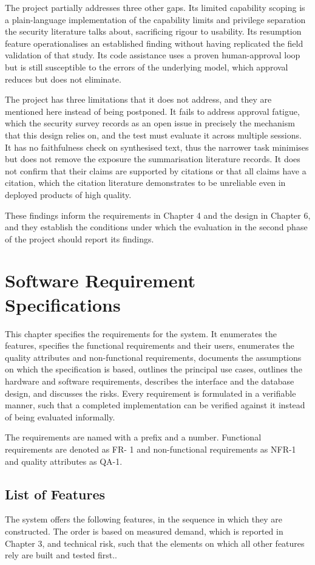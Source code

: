 \documentclass{FastFyp}
\begin{document}
The project partially addresses three other gaps. Its limited capability scoping is a plain-language implementation of the capability limits and privilege separation the security literature talks about, sacrificing rigour to usability. Its resumption feature operationalises an established finding without having replicated the field validation of that study. Its code assistance uses a proven human-approval loop but is still susceptible to the errors of the underlying model, which approval reduces but does not eliminate.

The project has three limitations that it does not address, and they are mentioned here instead of being postponed. It fails to address approval fatigue, which the security survey records as an open issue in precisely the mechanism that this design relies on, and the test must evaluate it across multiple sessions. It has no faithfulness check on synthesised text, thus the narrower task minimises but does not remove the exposure the summarisation literature records. It does not confirm that their claims are supported by citations or that all claims have a citation, which the citation literature demonstrates to be unreliable even in deployed products of high quality.

These findings inform the requirements in Chapter 4 and the design in Chapter 6, and they establish the conditions under which the evaluation in the second phase of the project should report its findings.


\chapter{Software Requirement Specifications}
This chapter specifies the requirements for the system. It enumerates the features, specifies the functional requirements and their users, enumerates the quality attributes and non-functional requirements, documents the assumptions on which the specification is based, outlines the principal use cases, outlines the hardware and software requirements, describes the interface and the database design, and discusses the risks. Every requirement is formulated in a verifiable manner, such that a completed implementation can be verified against it instead of being evaluated informally.

The requirements are named with a prefix and a number. Functional requirements are denoted as FR- 1 and non-functional requirements as NFR-1 and quality attributes as QA-1.

\section{List of Features}
The system offers the following features, in the sequence in which they are constructed. The order is based on measured demand, which is reported in Chapter 3, and technical risk, such that the elements on which all other features rely are built and tested first..
\end{document}
